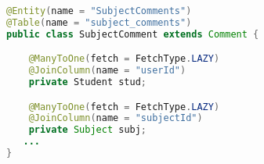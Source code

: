 \begin{lstlisting}[language=Java,  basicstyle=\footnotesize]
@Entity(name = "SubjectComments")
@Table(name = "subject_comments")
public class SubjectComment extends Comment {

	@ManyToOne(fetch = FetchType.LAZY)
	@JoinColumn(name = "userId")
	private Student stud;

	@ManyToOne(fetch = FetchType.LAZY)
	@JoinColumn(name = "subjectId")
	private Subject subj;
   ...
}
\end{lstlisting}
